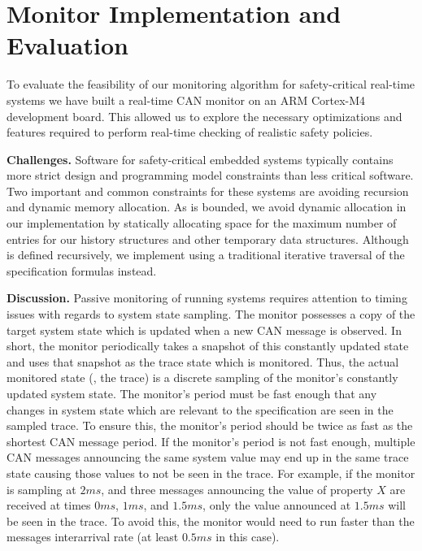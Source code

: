 
\section{Monitor Implementation and Evaluation}
\label{sec:implementation}

To evaluate the feasibility of our monitoring algorithm for safety-critical
real-time systems we have built a real-time CAN monitor on an ARM Cortex-M4
development board. This allowed us to explore the necessary optimizations and
features required to perform real-time checking of realistic safety policies.


\noindent\textbf{Challenges. }
Software for safety-critical embedded systems typically contains more strict
design and programming model constraints than less critical software. Two
important and common constraints for these systems are avoiding recursion  and
 dynamic memory allocation.
As \planguage is bounded, we avoid dynamic allocation
in our \monitor implementation by statically allocating space for the maximum
number of entries for our history structures and other temporary data structures.
Although \monitor is defined recursively,
we  implement \monitor using a traditional iterative traversal
of the specification formulas instead.

\noindent\textbf{Discussion. }
Passive monitoring of running systems requires attention to timing issues with regards to system state sampling.
%
The monitor possesses a copy of the target system state 
which is updated when a new CAN message is observed.
In short, the monitor periodically takes a snapshot of this constantly updated state and uses that snapshot as the trace state which is monitored.
%
Thus, the actual monitored state (\ie, the trace) is a discrete sampling of the monitor's constantly updated system state. 
The monitor's period must be fast enough that any changes in system state which are relevant to the specification are seen in the sampled trace.
To ensure this, the monitor's period should be twice as fast as the shortest CAN message period.
If the monitor's period is not fast enough, multiple CAN messages announcing the same system value may end up in the same trace state causing those values to not be seen in the trace.
For example, if the monitor is sampling at $2ms$, and three messages announcing the value of property $X$ are received at times $0ms$, $1ms$, and $1.5ms$, only the value announced at $1.5ms$ will be seen in the trace. To avoid this, the monitor would need to run faster than the messages interarrival rate (at least $0.5ms$ in this case).

